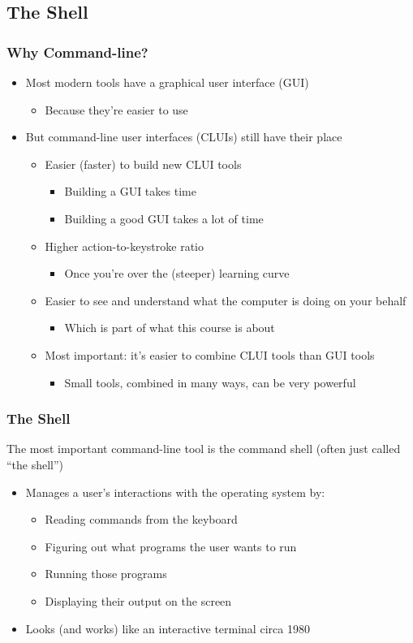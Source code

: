 \subsection{The Shell}
\begin{frame}\frametitle{Why Command-line?}
\begin{itemize}
\item Most modern tools have a graphical user interface (GUI)
\begin{itemize}
    \item Because they're easier to use
\end{itemize}
\item But command-line user interfaces (CLUIs) still have their place
\begin{itemize}
    \item Easier (faster) to build new CLUI tools
\begin{itemize}
          \item Building a GUI takes time
          \item Building a good GUI takes a lot of time
\end{itemize}
    \item Higher action-to-keystroke ratio
\begin{itemize}
          \item Once you're over the (steeper) learning curve
\end{itemize}
    \item Easier to see and understand what the computer is doing on your behalf
\begin{itemize}
          \item Which is part of what this course is about
\end{itemize}
    \item Most important: it's easier to combine CLUI tools than GUI tools
\begin{itemize}
          \item Small tools, combined in many ways, can be very powerful
\end{itemize}
\end{itemize}
\end{itemize}
\end{frame}

\begin{frame}\frametitle{The Shell}
The most important command-line tool is the command shell (often just called “the shell”)
\begin{itemize}
    \item Manages a user's interactions with the operating system by:
\begin{itemize}
          \item Reading commands from the keyboard
          \item Figuring out what programs the user wants to run
          \item Running those programs
          \item Displaying their output on the screen
\end{itemize}
    \item Looks (and works) like an interactive terminal circa 1980
\end{itemize}
\end{frame}


